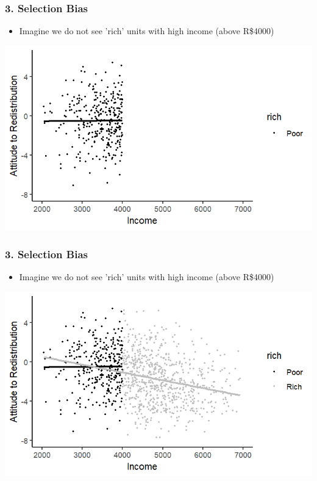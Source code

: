 \documentclass[xcolor=x11names,compress]{beamer}\usepackage[]{graphicx}\usepackage[]{color}
\makeatletter
\def\maxwidth{ %
  \ifdim\Gin@nat@width>\linewidth
    \linewidth
  \else
    \Gin@nat@width
  \fi
}
\newenvironment{knitrout}{}{} %
\renewcommand{\(}{\begin{columns}}
\renewcommand{\)}{\end{columns}}
\newcommand{\<}[1]{\begin{column}{#1}}
\renewcommand{\>}{\end{column}}
\makeatother
\begin{document}
\begin{frame}
\frametitle{3. Selection Bias}
\begin{itemize}
\item Imagine we do not see 'rich' units with high income (above R\$4000)
\end{itemize}
\begin{knitrout}
\color{fgcolor}
\includegraphics[width=\maxwidth]{figure/selection1-1} 

\end{knitrout}
\end{frame}

\begin{frame}
\frametitle{3. Selection Bias}
\begin{itemize}
\item Imagine we do not see 'rich' units with high income (above R\$4000)
\end{itemize}
\begin{knitrout}
\color{fgcolor}
\includegraphics[width=\maxwidth]{figure/selection2-1} 

\end{knitrout}
\end{frame}
\end{document}
